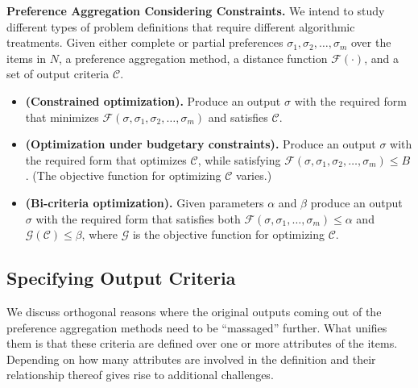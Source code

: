 \documentclass[11pt]{article}
\begin{document}
\vspace{-0.1in}
\begin{definition}\label{def2}
{\bf Preference Aggregation Considering Constraints.} 
We intend to study different types of problem definitions that require different algorithmic treatments.
Given either complete or partial preferences $\sigma_1,\sigma_2,\ldots,\sigma_m$ over the items in $N$, a preference aggregation method, a distance function $\mathcal{F}(\cdot)$, and a set of output criteria $\mathcal{C}$.
\vspace{-0.1in}
\begin{itemize}
    \item {\bf (Constrained optimization).} Produce an output $\sigma$ with the required form that minimizes $\mathcal{F}(\sigma,\sigma_1,\sigma_2,\ldots,\sigma_m)$ and satisfies $\mathcal{C}$.
    \vspace{-0.1in}
    \item {\bf (Optimization under budgetary constraints).} Produce an output $\sigma$ with the required form that optimizes $\mathcal{C}$,  while satisfying $\mathcal{F}(\sigma,\sigma_1,\sigma_2,\ldots,\sigma_m) \leq B$. (The objective function for optimizing $\mathcal{C}$ varies.)
    \vspace{-0.1in}
    \item {\bf (Bi-criteria optimization).} Given parameters $\alpha$ and $\beta$ produce an output $\sigma$ with the required form that satisfies both $\mathcal{F}(\sigma,\sigma_1,\ldots,\sigma_m) \le \alpha$ and $\mathcal{G}(\mathcal{C}) \le \beta$, where $\mathcal{G}$ is the objective function for optimizing $\mathcal{C}$.
\end{itemize}
\end{definition}
\vspace{-0.1in}
\subsection{Specifying Output Criteria}
We discuss orthogonal reasons where the original outputs coming out of the preference aggregation methods need to be ``massaged'' further. What unifies them is that these criteria are defined over one or more attributes of the items. Depending on how many attributes are involved in the definition and their relationship thereof gives rise to additional challenges.
\end{document}
